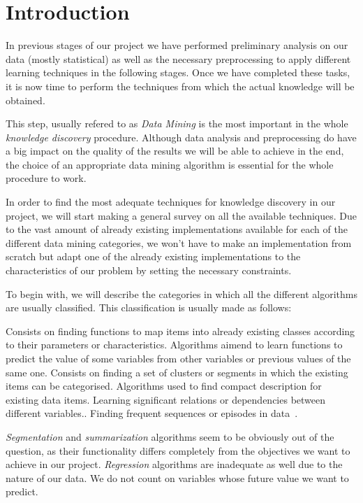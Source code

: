 \section{Introduction}
\label{sec:datamining}
In previous stages of our project we have performed preliminary analysis on our data (mostly statistical) as well as the necessary preprocessing to apply different learning techniques in the following stages. Once we have completed these tasks, it is now time to perform the techniques from which the actual knowledge will be obtained.

This step, usually refered to as \emph{Data Mining} is the most important in the whole \emph{knowledge discovery} procedure. Although data analysis and preprocessing do have a big impact on the quality of the results we will be able to achieve in the end, the choice of an appropriate data mining algorithm is essential for the whole procedure to work.

In order to find the most adequate techniques for knowledge discovery in our project, we will start making a general survey on all the available techniques. Due to the vast amount of already existing implementations available for each of the different data mining categories, we won't have to make an implementation from scratch but adapt one of the already existing implementations to the characteristics of our problem by setting the necessary constraints.

To begin with, we will describe the categories in which all the different algorithms are usually classified. This classification is usually made as follows:

\begin{enumerate}
  Consists on finding functions to map items into already existing classes according to their parameters or characteristics.
  Algorithms aimend to learn functions to predict the value of some variables from other variables or previous values of the same one.
  Consists on finding a set of clusters or segments in which the existing items can be categorised.
  Algorithms used to find compact description for existing data items.
  Learning significant relations or dependencies between different variables.\cite{Zhao2003association}.
  Finding frequent sequences or episodes in data~\cite{zhao2003sequential,weiss2002predicting}.
\end{enumerate}

\emph{Segmentation} and \emph{summarization} algorithms seem to be obviously out of the question, as their functionality differs completely from the objectives we want to achieve in our project. \emph{Regression} algorithms are inadequate as well due to the nature of our data. We do not count on variables whose future value we want to predict.

